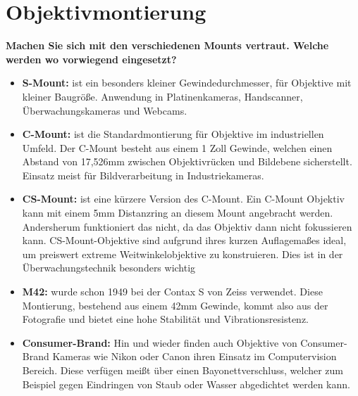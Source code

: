 \documentclass[a4paper]{article}
\begin{document}
	\section{Objektivmontierung}
	\textbf{Machen Sie sich mit den verschiedenen Mounts vertraut. Welche werden wo vorwiegend
		eingesetzt?}\\
	\begin{itemize}
		\item \textbf{S-Mount:} ist ein besonders kleiner Gewindedurchmesser, für Objektive mit kleiner Baugröße. Anwendung in Platinenkameras, Handscanner, Überwachungskameras und Webcams.\\
		\item \textbf{C-Mount:} ist die Standardmontierung für Objektive im industriellen Umfeld. Der C-Mount besteht aus einem 1 Zoll Gewinde, welchen einen Abstand von 17,526mm zwischen Objektivrücken und Bildebene sicherstellt. Einsatz meist für Bildverarbeitung in Industriekameras.\\
		\item \textbf{CS-Mount:} ist eine kürzere Version des C-Mount. Ein C-Mount Objektiv kann mit einem 5mm Distanzring an diesem Mount angebracht werden. Andersherum funktioniert das nicht, da das Objektiv dann nicht fokussieren kann. CS-Mount-Objektive sind aufgrund ihres kurzen Auflagemaßes ideal, um preiswert extreme Weitwinkelobjektive zu konstruieren. Dies ist in der Überwachungstechnik besonders wichtig\\
		\item \textbf{M42:} wurde schon 1949 bei der Contax S von Zeiss verwendet. Diese Montierung, bestehend aus einem 42mm Gewinde, kommt also aus der Fotografie und bietet eine hohe Stabilität und Vibrationsresistenz.\\
		\item \textbf{Consumer-Brand:} Hin und wieder finden auch Objektive von Consumer-Brand Kameras wie Nikon oder Canon ihren Einsatz im Computervision Bereich. Diese verfügen meißt über einen Bayonettverschluss, welcher zum Beispiel gegen Eindringen von Staub oder Wasser abgedichtet werden kann.\\
	\end{itemize}
	
	\newpage
\end{document}
